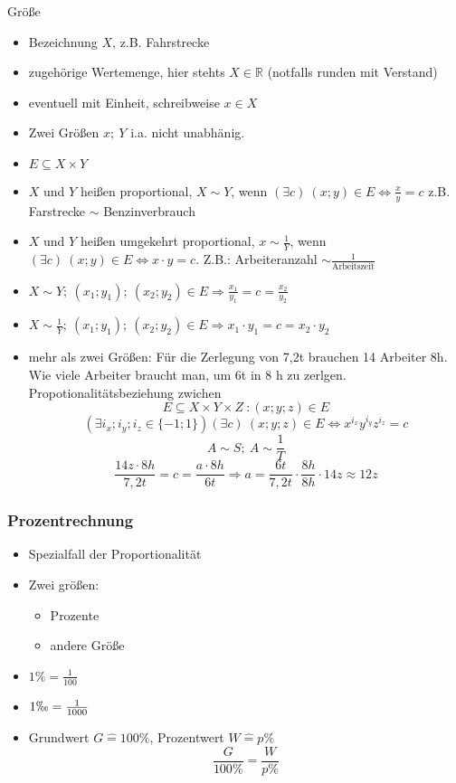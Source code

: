 Größe
\begin{itemize}
    \item Bezeichnung $X$, z.B. Fahrstrecke
    \item zugehörige Wertemenge, hier stehts $X\in \mathbb{R}$ (notfalls runden mit Verstand)
    \item eventuell mit Einheit, schreibweise $x \in X$
    \item Zwei Größen $x;\ Y$ i.a. nicht unabhänig.
    \item $E \subseteq X \times Y$
    \item $X$ und $Y$ heißen proportional, $X \sim Y$, wenn $(\exists c)\ (x;y) \in E \Leftrightarrow \frac{x}{y}=c$ z.B. Farstrecke $\sim$ Benzinverbrauch
    \item $X$ und $Y$ heißen umgekehrt proportional, $x \sim \frac{1}{Y}$, wenn $(\exists c)\ (x;y) \in E \Leftrightarrow x \cdot y = c$. Z.B.: Arbeiteranzahl $\sim \frac{1}{\textrm{Arbeitszeit}}$
    \item $X \sim Y;\ (x_1;y_1);\ (x_2;y_2) \in E \Rightarrow \frac{x_1}{y_1} = c = \frac{x_2}{y_2}$
    \item $X \sim \frac{1}{Y};\ (x_1;y_1);\ (x_2;y_2) \in E \Rightarrow x_1 \cdot y_1 = c = x_2 \cdot y_2$
    \item mehr als zwei Größen: Für die Zerlegung von 7,2t brauchen 14 Arbeiter 8h. Wie viele Arbeiter braucht man, um 6t in 8 h zu zerlgen. \\
    Propotionalitätsbeziehung zwichen $$E \subseteq X \times  Y \times Z\ : (x; y; z) \in E$$ $$(\exists i_x; i_y; i_z \in \lbrace -1; 1 \rbrace) (\exists c)\ (x;y;z) \in E \Leftrightarrow x^{i_x}y^{i_y}z^{i_z} = c$$
    $$A \sim S;\ A \sim \frac{1}{T}$$
    $$\frac{14z \cdot 8h}{7{,}2t}=c=\frac{a \cdot 8h}{6t} \Rightarrow a = \frac{6t}{7{,}2t}\cdot \frac{8h}{8h} \cdot 14z \approx 12z$$
\end{itemize}
\subsubsection{Prozentrechnung}
\begin{itemize}
    \item Spezialfall der Proportionalität
    \item Zwei größen:\
    \begin{itemize}
        \item Prozente
        \item andere Größe
    \end{itemize}
    \item $1\% = \frac{1}{100}$
    \item $1\permil = \frac{1}{1000}$
    \item Grundwert $G \hat{=} 100\%$, Prozentwert $W \hat{=} p\%$
    $$\frac{G}{100\%} = \frac{W}{p\%}$$
\end{itemize}
